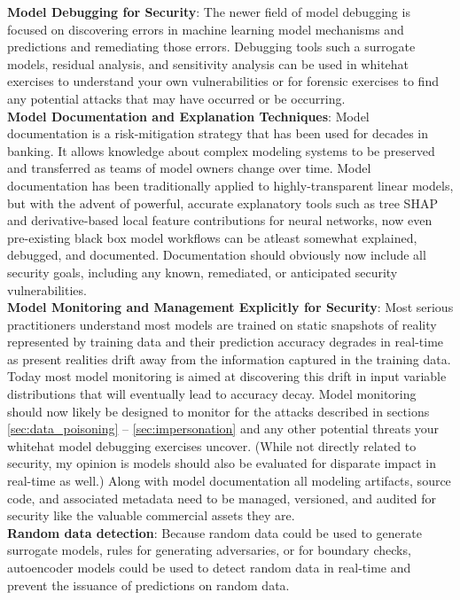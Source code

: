 \documentclass[fleqn]{article}
\begin{document}
\noindent\textbf{Model Debugging for Security}: The newer field of model debugging is focused on discovering errors in machine learning model mechanisms and predictions and remediating those errors. Debugging tools such a surrogate models, residual analysis, and sensitivity analysis can be used in whitehat exercises to understand your own vulnerabilities or for forensic exercises to find any potential attacks that may have occurred or be occurring.\\

\noindent\textbf{Model Documentation and Explanation Techniques}: Model documentation is a risk-mitigation strategy that has been used for decades in banking. It allows knowledge about complex modeling systems to be preserved and transferred as teams of model owners change over time. Model documentation has been traditionally applied to highly-transparent linear models, but with the advent of powerful, accurate explanatory tools such as tree SHAP and derivative-based local feature contributions for neural networks, now even pre-existing black box model workflows can be atleast somewhat explained, debugged, and documented. Documentation should obviously now include all security goals, including any known, remediated, or anticipated security vulnerabilities.\\

\noindent\textbf{Model Monitoring and Management Explicitly for Security}: Most serious practitioners understand most models are trained on static snapshots of reality represented by training data and their prediction accuracy degrades in real-time as present realities drift away from the information captured in the training data. Today most model monitoring is aimed at discovering this drift in input variable distributions that will eventually lead to accuracy decay. Model monitoring should now likely be designed to monitor for the attacks described in sections  \ref{sec:data_poisoning} -- \ref{sec:impersonation} and any other potential threats your whitehat model debugging exercises uncover. (While not directly related to security, my opinion is models should also be evaluated for disparate impact in real-time as well.) Along with model documentation all modeling artifacts, source code, and associated metadata need to be managed, versioned, and audited for security like the valuable commercial assets they are.\\

\noindent\textbf{Random data detection}: Because random data could be used to generate surrogate models, rules for generating adversaries, or for boundary checks, autoencoder models could be used to detect random data in real-time and prevent the issuance of predictions on random data.\\
\end{document}
